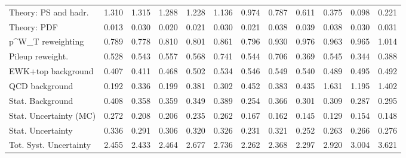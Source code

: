 \begin{tabular}{l|p{0.6cm}p{0.6cm}p{0.6cm}p{0.6cm}p{0.6cm}p{0.6cm}p{0.6cm}p{0.6cm}p{0.6cm}p{0.6cm}p{0.6cm}}
Theory: PS and hadr.                     & 1.310 & 1.315 & 1.288 & 1.228 & 1.136 & 0.974 & 0.787 & 0.611 & 0.375 & 0.098 & 0.221 \\
Theory: PDF                              & 0.013 & 0.030 & 0.020 & 0.021 & 0.030 & 0.021 & 0.038 & 0.039 & 0.038 & 0.030 & 0.031 \\
p^{W}_{T} reweighting                    & 0.789 & 0.778 & 0.810 & 0.801 & 0.861 & 0.796 & 0.930 & 0.976 & 0.963 & 0.965 & 1.014 \\
Pileup reweight.                         & 0.528 & 0.543 & 0.557 & 0.568 & 0.741 & 0.544 & 0.706 & 0.369 & 0.545 & 0.344 & 0.388 \\
EWK+top background                       & 0.407 & 0.411 & 0.468 & 0.502 & 0.534 & 0.546 & 0.549 & 0.540 & 0.489 & 0.495 & 0.492 \\
QCD background                           & 0.192 & 0.336 & 0.199 & 0.381 & 0.302 & 0.452 & 0.383 & 0.435 & 1.631 & 1.195 & 1.402 \\
Stat. Background                         & 0.408 & 0.358 & 0.359 & 0.349 & 0.389 & 0.254 & 0.366 & 0.301 & 0.309 & 0.287 & 0.295 \\
Stat. Uncertainty (MC)                   & 0.272 & 0.208 & 0.206 & 0.235 & 0.262 & 0.167 & 0.162 & 0.145 & 0.129 & 0.154 & 0.148 \\
\hline
Stat. Uncertainty                        & 0.336 & 0.291 & 0.306 & 0.320 & 0.326 & 0.231 & 0.321 & 0.252 & 0.263 & 0.266 & 0.276 \\
\hline
Tot. Syst. Uncertainty                   & 2.455 & 2.433 & 2.464 & 2.677 & 2.736 & 2.262 & 2.368 & 2.297 & 2.920 & 3.004 & 3.621 \\
\hline
\end{tabular}
